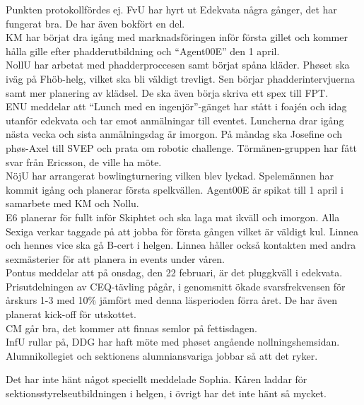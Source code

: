 \documentclass[10pt]{article}
\begin{document}
\begin{paragrafer}
\begin{paragrafer}
Punkten protokollfördes ej.
FvU har hyrt ut Edekvata några gånger, det har fungerat bra. De har även bokfört en del.\\
KM har börjat dra igång med marknadsföringen inför första gillet och kommer hålla gille efter phadderutbildning och ``Agent00E'' den 1 april.\\
NollU har arbetat med phadderproccesen samt börjat spåna kläder. Phøset ska iväg på Fhöb-helg, vilket ska bli väldigt trevligt. Sen börjar phadderintervjuerna samt mer planering av klädsel. De ska även börja skriva ett spex till FPT.\\
ENU meddelar att ``Lunch med en ingenjör''-gänget har stått i foajén och idag utanför edekvata och tar emot anmälningar till eventet. Luncherna drar igång nästa vecka och sista anmälningsdag är imorgon. På måndag ska Josefine och phøs-Axel till SVEP och prata om robotic challenge. Törmänen-gruppen har fått svar från Ericsson, de ville ha möte. \\
NöjU har arrangerat bowlingturnering vilken blev lyckad. Spelemännen har kommit igång och planerar första spelkvällen. Agent00E är spikat till 1 april i samarbete med KM och Nollu. \\
E6 planerar för fullt inför Skiphtet och ska laga mat ikväll och imorgon. Alla Sexiga verkar taggade på att jobba för första gången vilket är väldigt kul. Linnea och hennes vice ska gå B-cert i helgen. Linnea håller också kontakten med andra sexmästerier för att planera in events under våren.\\
Pontus meddelar att på onsdag, den 22 februari, är det pluggkväll i edekvata. Prisutdelningen av CEQ-tävling pågår, i genomsnitt ökade svarsfrekvensen för årskurs 1-3 med 10\% jämfört med denna läsperioden förra året. De har även planerat kick-off för utskottet.\\
CM går bra, det kommer att finnas semlor på fettisdagen.\\
InfU rullar på, DDG har haft möte med phøset angående nollningshemsidan. Alumnikollegiet och sektionens alumniansvariga jobbar så att det ryker.

Det har inte hänt något speciellt meddelade Sophia.
Kåren laddar för sektionsstyrelseutbildningen i helgen, i övrigt har det inte hänt så mycket.
\end{paragrafer}


\end{paragrafer}
\end{document}
